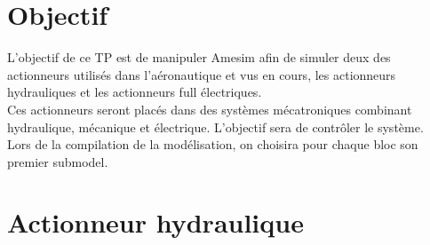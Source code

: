 \documentclass[a4paper,12pt,calibri,oneside,openany]{book}
\theoremstyle{break}
\begin{document}

\frontmatter



\tableofcontents

\mainmatter
\pagestyle{fancy}
\chapter{Objectif}

\qquad L'objectif de ce TP est de manipuler Amesim afin de simuler deux des actionneurs utilisés dans l'aéronautique et vus en cours, les actionneurs hydrauliques et les actionneurs full électriques.\\

Ces actionneurs seront placés dans des systèmes mécatroniques combinant hydraulique, mécanique et électrique. L'objectif sera de contrôler le système.\\

Lors de la compilation de la modélisation, on choisira pour chaque bloc son premier submodel.

\chapter{Actionneur hydraulique}
\end{document}
